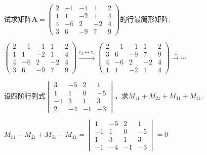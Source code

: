\begin{exercise}
    试求矩阵$\boldsymbol{A}=
    \begin{pmatrix}
        2 & -1 & -1 & 1 & 2\\
        1 & 1 & -2 & 1 & 4\\
        4 & -6 & 2 & -2 & 4\\
        3 & 6 & -9 & 7 & 9
    \end{pmatrix}
    $的行最简形矩阵.
\end{exercise}
\begin{solution}
    $\begin{pmatrix}
        2 & -1 & -1 & 1 & 2\\
        1 & 1 & -2 & 1 & 4\\
        4 & -6 & 2 & -2 & 4\\
        3 & 6 & -9 & 7 & 9
    \end{pmatrix}
    \stackrel{r_2\leftrightarrow r_4}{\longrightarrow}
    \begin{pmatrix}
        2 & -1 & -1 & 1 & 2\\
        3 & 6 & -9 & 7 & 9\\
        4 & -6 & 2 & -2 & 4\\
        1 & 1 & -2 & 1 & 4
    \end{pmatrix}
    \stackrel{...}{\longrightarrow}\cdots
    $
\end{solution}

\begin{exercise}
    设四阶行列式$
    \begin{vmatrix}
        3 & -5 & 2 & 1\\
        1 & 1 & 0 & -5\\
        -1 & 3 & 1 & 3\\
        2 & -4 &-1 & -3
    \end{vmatrix}
    $，求$M_{11}+M_{21}+M_{31}+M_{41}$.
\end{exercise}
\begin{solution}
    $M_{11}+M_{21}+M_{31}+M_{41}=  
    \begin{vmatrix}
        1 & -5 & 2 & 1\\
        -1 & 1 & 0 & -5\\
        1 & 3 & 1 & 3\\
        -1 & -4 &-1 & -3
    \end{vmatrix}=0$
\end{solution}

